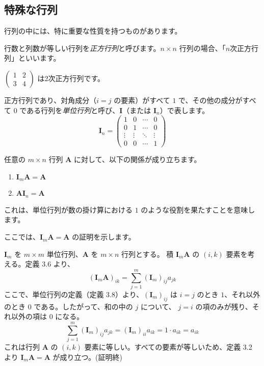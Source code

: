 \subsection{特殊な行列}
行列の中には、特に重要な性質を持つものがあります。
\begin{dfn}[正方行列]
行数と列数が等しい行列を\emph{正方行列}と呼びます。$n \times n$ 行列の場合、「$n$次正方行列」といいます。
\end{dfn}
\begin{ex}
$\begin{pmatrix} 1 & 2 \\ 3 & 4 \end{pmatrix}$ は2次正方行列です。
\end{ex}
\begin{dfn}[単位行列]
正方行列であり、対角成分（$i=j$ の要素）がすべて $1$ で、その他の成分がすべて $0$ である行列を\emph{単位行列}と呼び、$\bm{I}$（または $\bm{I}_n$）で表します。
$$\bm{I}_n = \begin{pmatrix}
1 & 0 & \cdots & 0 \\
0 & 1 & \cdots & 0 \\
\vdots & \vdots & \ddots & \vdots \\
0 & 0 & \cdots & 1
\end{pmatrix}$$
\end{dfn}
\begin{thm}[単位行列の性質]
任意の $m \times n$ 行列 $\bm{A}$ に対して、以下の関係が成り立ちます。
\begin{enumerate}
\item $\bm{I}_m \bm{A} = \bm{A}$
\item $\bm{A} \bm{I}_n = \bm{A}$
\end{enumerate}
これは、単位行列が数の掛け算における $1$ のような役割を果たすことを意味します。
\begin{proof*}
ここでは、$\bm{I}_m \bm{A} = \bm{A}$ の証明を示します。\par
$\bm{I}_m$ を $m \times m$ 単位行列、$\bm{A}$ を $m \times n$ 行列とする。
積 $\bm{I}_m \bm{A}$ の $(i,k)$ 要素を考える。定義 3.6 より、
\[(\bm{I}_m \bm{A})_{ik} = \sum_{j=1}^{m} (\bm{I}_m)_{ij} a_{jk}\]
ここで、単位行列の定義（定義 3.8）より、$ (\bm{I}_m)_{ij} $ は $i=j$ のとき $1$、それ以外のとき $0$ である。したがって、和の中の $j$ について、 $j=i$ の項のみが残り、それ以外の項は $0$ になる。
\[\sum_{j=1}^{m} (\bm{I}_m)_{ij} a_{jk} = (\bm{I}_m)_{ii} a_{ik} = 1 \cdot a_{ik} = a_{ik}\]
これは行列 $\bm{A}$ の $(i,k)$ 要素に等しい。すべての要素が等しいため、定義 3.2 より $\bm{I}_m \bm{A} = \bm{A}$ が成り立つ。(証明終)
\end{proof*}
\end{thm}


